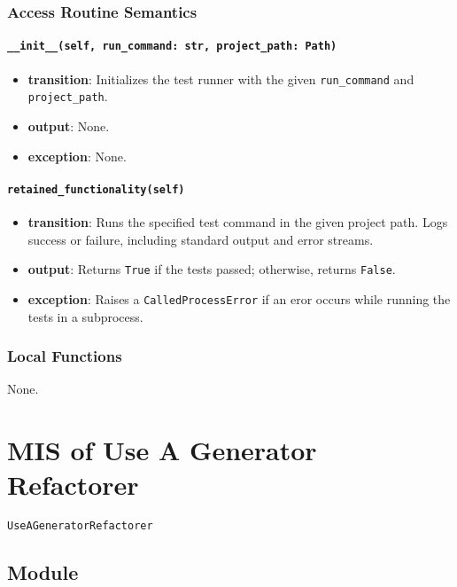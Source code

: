 \documentclass[12pt, titlepage]{article}
\begin{document}
\subsubsection{Access Routine Semantics}

\paragraph{\texttt{\_\_init\_\_(self, run\_command: str, project\_path: Path)}}
\begin{itemize}
  \item \textbf{transition}: Initializes the test runner with the given \texttt{run\_command} and \texttt{project\_path}.
  \item \textbf{output}: None.
  \item \textbf{exception}: None.
\end{itemize}

\paragraph{\texttt{retained\_functionality(self)}}
\begin{itemize}
  \item \textbf{transition}: Runs the specified test command in the given project path. Logs success or failure, including standard output and error streams.
  \item \textbf{output}: Returns \texttt{True} if the tests passed; otherwise, returns \texttt{False}.
  \item \textbf{exception}: Raises a \texttt{CalledProcessError} if an eror occurs while running the tests in a subprocess.
\end{itemize}

\subsubsection{Local Functions}
None.

\newpage

\section{MIS of Use A Generator Refactorer} \label{mis:UseGen}

\texttt{UseAGeneratorRefactorer}

\subsection{Module}
\end{document}
